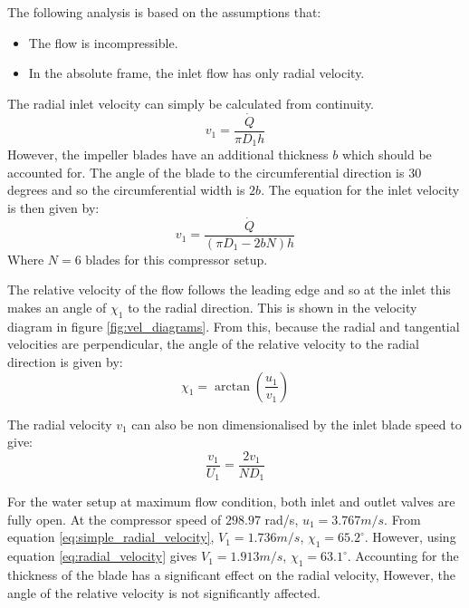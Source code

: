 \documentclass{article}
\begin{document}

The following analysis is based on the assumptions that:
\begin{itemize}
    \item The flow is incompressible.
    \item In the absolute frame, the inlet flow has only radial velocity.
\end{itemize} 

The radial inlet velocity can simply be calculated from continuity.
\begin{equation}
    v_1 = \frac{\dot{Q}}{\pi D_1 h} \label{eq:simple_radial_velocity}
\end{equation}
However, the impeller blades have an additional thickness $b$ which should be accounted for.
The angle of the blade to the circumferential direction is 30 degrees and so the circumferential width is $2b$.
The equation for the inlet velocity is then given by:
\begin{equation}
    v_1 = \frac{\dot{Q}}{(\pi D_1 - 2b N) h} \label{eq:radial_velocity}
\end{equation}
Where $N = 6$ blades for this compressor setup.

The relative velocity of the flow follows the leading edge and so at the inlet this makes an angle of $\chi_1$ to the radial direction.
This is shown in the velocity diagram in figure \ref{fig:vel_diagrams}.
From this, because the radial and tangential velocities are perpendicular,
the angle of the relative velocity to the radial direction is given by:
\begin{equation}
    \chi_1 = \arctan\left( \frac{u_1}{v_1} \right)
\end{equation}

The radial velocity $v_1$ can also be non dimensionalised by the inlet blade speed to give:
\begin{equation}
    \frac{v_1}{U_1} = \frac{2v_1}{N D_1}
\end{equation}


For the water setup at maximum flow condition, both inlet and outlet valves are fully open.
At the compressor speed of $298.97$ rad/s, $u_1 = 3.767 m/s$.
From equation \ref{eq:simple_radial_velocity}, $V_1 = 1.736 m/s$, $\chi_1 = 65.2^\circ$.
However, using equation \ref{eq:radial_velocity} gives $V_1 = 1.913 m/s$, $\chi_1 = 63.1^\circ$.
Accounting for the thickness of the blade has a significant effect on the radial velocity,
However, the angle of the relative velocity is not significantly affected.
\end{document}
